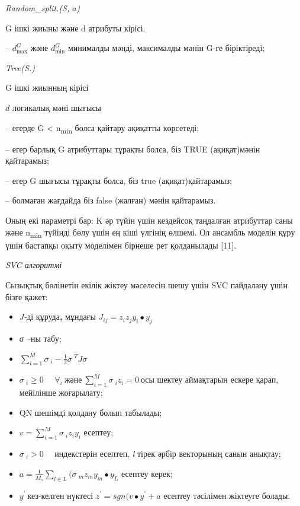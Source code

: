 \emph{Random\_split.(S,} \(a\)\emph{)}

G ішкі жиыны және d атрибуты кірісі.

-- \(d_{\max}^{G}\) және \(d_{\min}^{G}\) минималды мәнді, максималды
мәнін G-ге біріктіреді;

\emph{Tree(S.)}

G ішкі жиынның кірісі

\(d\) логикалық мәні шығысы

-- егерде \textbar{} G \textbar{} \textless{} n\textsubscript{min} болса
қайтару ақиқатты көрсетеді;

-- егер барлық G атрибуттары тұрақты болса, біз TRUE (ақиқат)мәнін
қайтарамыз;

-- егер G шығысы тұрақты болса, біз true (ақиқат)қайтарамыз;

-- болмаған жағдайда біз false (жалған) мәнін қайтарамыз.

Оның екі параметрі бар: K әр түйін үшін кездейсоқ таңдалған атрибуттар
саны және n\textsubscript{min} түйінді бөлу үшін ең кіші үлгінің өлшемі.
Ол ансамбль моделін құру үшін бастапқы оқыту моделімен бірнеше рет
қолданылады {[}11{]}.

\emph{SVC алгоритмі}

Сызықтық бөлінетін екілік жіктеу мәселесін шешу үшін SVC пайдалану үшін
бізге қажет:

\begin{itemize}
\item
  \emph{J-}ді құруда{\bfseries ,} мұндағы
  \(J_{ij} = z_{i}z_{j}y_{i} \bullet y_{j}\)
\item
  σ --ны табу;
\item
  \(\sum_{i = 1}^{M}{}{\sigma\ }_{i} - \frac{1}{2}{\sigma\ }^{T}J\sigma\ \)
\item
  \({\sigma\ }_{i} \geq 0\ \ \ \ \ \ \forall_{i}\ және\ \sum_{i = 1}^{M}{}{\sigma\ }_{i}z_{i} = 0\ \)осы
  шектеу аймақтарын ескере қарап, мейілінше жоғарылату;
\item
  QN шешімді қолдану болып табылады;
\item
  \(v = \sum_{i = 1}^{M}{}{\sigma\ }_{i}z_{i}y_{i}\) есептеу;
\item
  \({\sigma\ }_{i} > 0\ \ \ \ \ \ \)индекстерін есептеп, \emph{l} тірек
  әрбір векторының санын анықтау;
\item
  \(a = \frac{1}{M_{s}}\sum_{l \in L}^{}{}({\sigma\ }_{m}z_{m}y_{m} \bullet y_{L}\)
  есептеу керек;
\item
  \(y^{'}\ \)кез-келген нүктесі \(z^{'} = sgn(v \bullet y^{'} + a\)
  есептеу тәсілімен жіктеуге болады.
\end{itemize}

